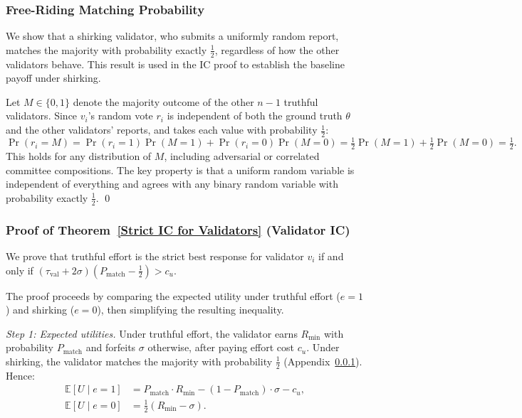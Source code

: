 \subsubsection{Free-Riding Matching Probability}
\label{app:freeriding}

We show that a shirking validator, who submits a uniformly random report, matches the majority with probability exactly $\frac{1}{2}$, regardless of how the other validators behave. This result is used in the IC proof to establish the baseline payoff under shirking.

Let $M \in \{0, 1\}$ denote the majority outcome of the other $n-1$ truthful validators. Since $v_i$'s random vote $r_i$ is independent of both the ground truth $\theta$ and the other validators' reports, and takes each value with probability $\frac{1}{2}$:
\[
\Pr(r_i = M) = \Pr(r_i = 1)\Pr(M = 1) + \Pr(r_i = 0)\Pr(M = 0) = \tfrac{1}{2}\Pr(M=1) + \tfrac{1}{2}\Pr(M=0) = \tfrac{1}{2}.
\]
This holds for any distribution of $M$, including adversarial or correlated committee compositions. The key property is that a uniform random variable is independent of everything and agrees with any binary random variable with probability exactly $\frac{1}{2}$. \qed


\subsubsection{Proof of Theorem~\ref{Strict IC for Validators} (Validator IC)}
\label{app:proof_ic}

We prove that truthful effort is the strict best response for validator $v_i$ if and only if $(\tau_{\text{val}} + 2\sigma)(P_{\text{match}} - \frac{1}{2}) > c_u$.

The proof proceeds by comparing the expected utility under truthful effort ($e = 1$) and shirking ($e = 0$), then simplifying the resulting inequality.

\textit{Step 1: Expected utilities.} Under truthful effort, the validator earns $R_{\min}$ with probability $P_{\text{match}}$ and forfeits $\sigma$ otherwise, after paying effort cost $c_u$. Under shirking, the validator matches the majority with probability $\frac{1}{2}$ (Appendix~\ref{app:freeriding}). Hence:
\begin{align}
\mathbb{E}[U \mid e=1] &= P_{\text{match}} \cdot R_{\min} - (1 - P_{\text{match}}) \cdot \sigma - c_u, \nonumber \\
\mathbb{E}[U \mid e=0] &= \tfrac{1}{2}(R_{\min} - \sigma). \nonumber
\end{align}

